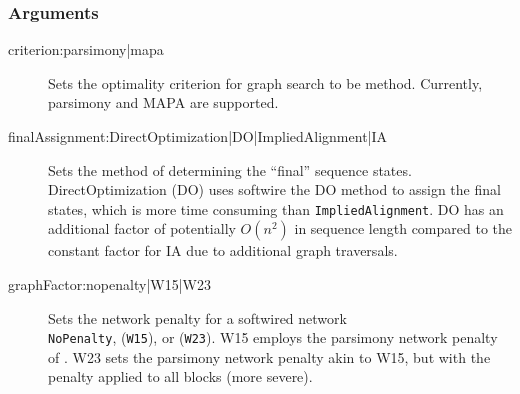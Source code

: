 	\subsubsection{Arguments}
		\begin{description}
			
			\item[criterion:parsimony|mapa] 
			Sets the optimality criterion for graph search to be 
			method. Currently, parsimony and MAPA \citep{Wheeler2014} 
			are supported.
			
			\item[finalAssignment:DirectOptimization|DO|ImpliedAlignment|IA] Sets the method 
			of determining the ``final'' sequence states. DirectOptimization (DO) uses softwire the DO 
			method to assign the final states, which is more time consuming than \texttt{ImpliedAlignment}. 
			DO has an additional factor of potentially $O(n^2)$ in sequence length compared 
			to the constant factor for IA due to additional graph traversals.
			
			
			\item[graphFactor:nopenalty|W15|W23] Sets the network penalty for a softwired network\\ 
			\texttt{NoPenalty}, (\texttt{W15}),  or (\texttt{W23}). W15 employs the
			parsimony network penalty of \cite{Wheeler2015}. W23 sets the parsimony network penalty akin to
			W15, but with the penalty applied to all blocks (more severe).
			

\end{description}
